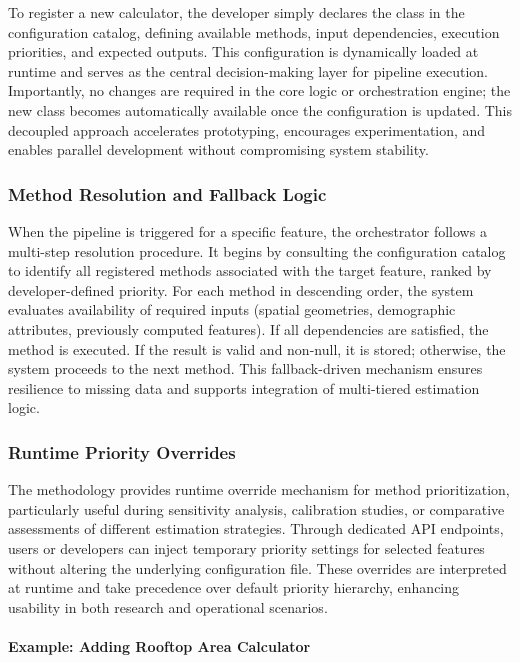 To register a new calculator, the developer simply declares the class in the configuration catalog, defining available methods, input dependencies, execution priorities, and expected outputs. This configuration is dynamically loaded at runtime and serves as the central decision-making layer for pipeline execution. Importantly, no changes are required in the core logic or orchestration engine; the new class becomes automatically available once the configuration is updated. This decoupled approach accelerates prototyping, encourages experimentation, and enables parallel development without compromising system stability.

\subsubsection{Method Resolution and Fallback Logic}

When the pipeline is triggered for a specific feature, the orchestrator follows a multi-step resolution procedure. It begins by consulting the configuration catalog to identify all registered methods associated with the target feature, ranked by developer-defined priority. For each method in descending order, the system evaluates availability of required inputs (spatial geometries, demographic attributes, previously computed features). If all dependencies are satisfied, the method is executed. If the result is valid and non-null, it is stored; otherwise, the system proceeds to the next method. This fallback-driven mechanism ensures resilience to missing data and supports integration of multi-tiered estimation logic.

\subsubsection{Runtime Priority Overrides}

The methodology provides runtime override mechanism for method prioritization, particularly useful during sensitivity analysis, calibration studies, or comparative assessments of different estimation strategies. Through dedicated API endpoints, users or developers can inject temporary priority settings for selected features without altering the underlying configuration file. These overrides are interpreted at runtime and take precedence over default priority hierarchy, enhancing usability in both research and operational scenarios.

\paragraph{Example: Adding Rooftop Area Calculator}

